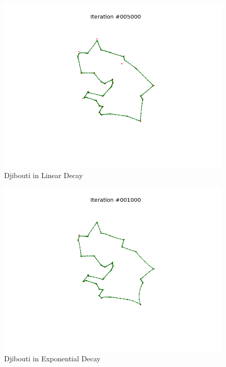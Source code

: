 \documentclass[11pt]{article}
\begin{document}
\begin{figure}[!ht]
  \centering
  \includegraphics[scale=0.6]{d_l.png}
  \caption{Djibouti in Linear Decay}
\end{figure}

\begin{figure}[!ht]
  \centering
  \includegraphics[scale=0.6]{d_e.png}
  \caption{Djibouti in Exponential Decay}
\end{figure}
\end{document}
